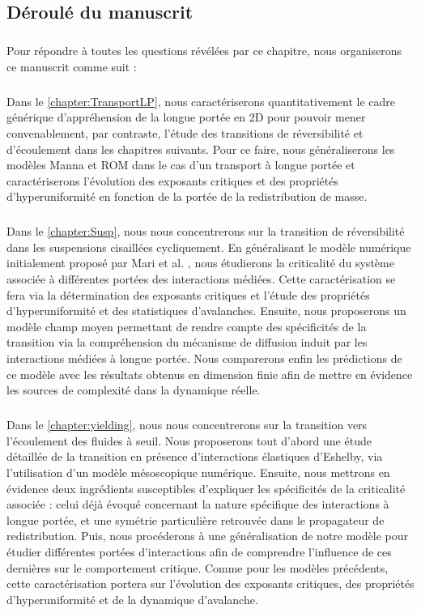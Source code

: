 \subsection{Déroulé du manuscrit}

\subparagraph{}Pour répondre à toutes les questions révélées par ce chapitre, nous organiserons ce manuscrit comme suit :

\subparagraph{}Dans le \autoref{chapter:TransportLP}, nous caractériserons quantitativement le cadre générique d'appréhension de la longue portée en 2D pour pouvoir mener convenablement, par contraste, l'étude des transitions de réversibilité et d'écoulement dans les chapitres suivants. Pour ce faire, nous généraliserons les modèles Manna et ROM dans le cas d'un transport à longue portée et caractériserons l'évolution des exposants critiques et des propriétés d'hyperuniformité en fonction de la portée de la redistribution de masse. 

\subparagraph{}Dans le \autoref{chapter:Susp}, nous nous concentrerons sur la transition de réversibilité dans les suspensions cisaillées cycliquement. En généralisant le modèle numérique initialement proposé par Mari et al. \cite{mari_absorbing_2022}, nous étudierons la criticalité du système associée à différentes portées des interactions médiées. Cette caractérisation se fera via la détermination des exposants critiques et l'étude des propriétés d'hyperuniformité et des statistiques d'avalanches. Ensuite, nous proposerons un modèle champ moyen permettant de rendre compte des spécificités de la transition via la compréhension du mécanisme de diffusion induit par les interactions médiées à longue portée. Nous comparerons enfin les prédictions de ce modèle avec les résultats obtenus en dimension finie afin de mettre en évidence les sources de complexité dans la dynamique réelle.

\subparagraph{}Dans le \autoref{chapter:yielding}, nous nous concentrerons sur la transition vers l'écoulement des fluides à seuil. Nous proposerons tout d'abord une étude détaillée de la transition en présence d'interactions élastiques d'Eshelby, via l'utilisation d'un modèle mésoscopique numérique. Ensuite, nous mettrons en évidence deux ingrédients susceptibles d'expliquer les spécificités de la criticalité associée : celui déjà évoqué concernant la nature spécifique des interactions à longue portée, et une symétrie particulière retrouvée dans le propagateur de redistribution. Puis, nous procéderons à une généralisation de notre modèle pour étudier différentes portées d'interactions afin de comprendre l'influence de ces dernières sur le comportement critique. Comme pour les modèles précédents, cette caractérisation portera sur l'évolution des exposants critiques, des propriétés d'hyperuniformité et de la dynamique d'avalanche.

